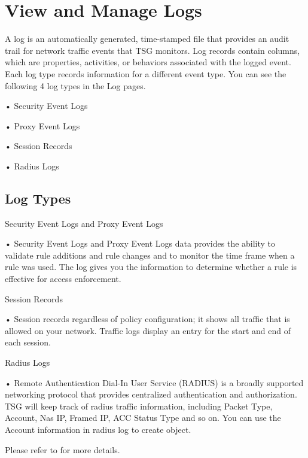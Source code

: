 \section*{\hypertarget{link:View and Manage Logs}{View and Manage Logs}}
\label{sec:monitor:log}

A log is an automatically generated, time-stamped file that provides an audit trail for network traffic events that TSG monitors. Log records contain columns, which are properties, activities, or behaviors associated with the logged event. Each log type records information for a different event type. You can see the following 4 log types in the Log pages.


• Security Event Logs 


• Proxy Event Logs


• Session Records 


• Radius Logs

\subsection*{\hypertarget{link:Log Types}{Log Types}}
\label{sec:monitor:log:type}

Security Event Logs and Proxy Event Logs


• Security Event Logs and Proxy Event Logs data provides the ability to validate rule additions and rule changes and to monitor the time frame when a rule was used. The log gives you the information to determine whether a rule is effective for access enforcement.


Session Records


• Session records regardless of policy configuration; it shows all traffic that is allowed on your network. Traffic logs display an entry for the start and end of each session. 


Radius Logs


• Remote Authentication Dial-In User Service (RADIUS) is a broadly supported networking protocol that provides centralized authentication and authorization. 
TSG will keep track of radius traffic information, including Packet Type, Account, Nas IP, Framed IP, ACC Status Type and so on. 
You can use the Account information in radius log to create \hyperlink{link:Subscriber ID}{\color{linkblue}{Subscriber ID}} object.


Please refer to \hyperlink{link:Appendix C Log Fields Description}{\color{linkblue}{Appendix C Logs Fields Description}} for more details.

